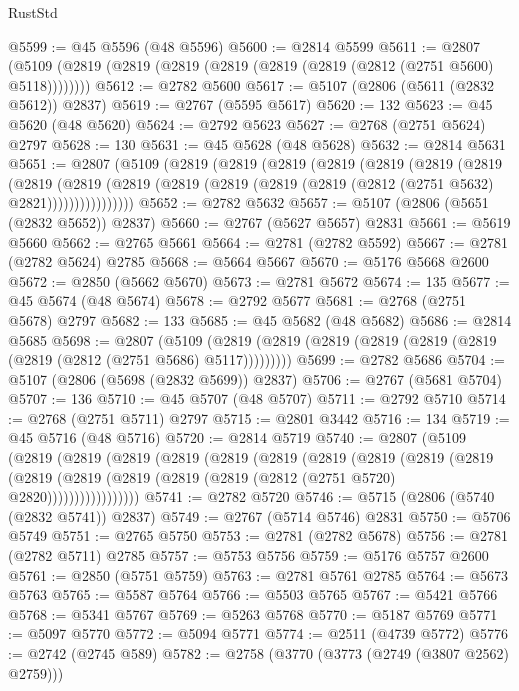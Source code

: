 \begin{lexlean}{RustStd}
\begin{coremodule}
@5599 := @45 @5596 (@48 @5596)
@5600 := @2814 @5599
@5611 := @2807 (@5109 (@2819 (@2819 (@2819 (@2819 (@2819 (@2819 (@2812 (@2751 @5600) @5118))))))))
@5612 := @2782 @5600
@5617 := @5107 (@2806 (@5611 (@2832 @5612)) @2837)
@5619 := @2767 (@5595 @5617)
@5620 := 132
@5623 := @45 @5620 (@48 @5620)
@5624 := @2792 @5623
@5627 := @2768 (@2751 @5624) @2797
@5628 := 130
@5631 := @45 @5628 (@48 @5628)
@5632 := @2814 @5631
@5651 := @2807
    (@5109
      (@2819
        (@2819
          (@2819
            (@2819
              (@2819
                (@2819
                  (@2819
                    (@2819
                      (@2819
                        (@2819
                          (@2819 (@2819 (@2819 (@2819 (@2812 (@2751 @5632) @2821))))))))))))))))
@5652 := @2782 @5632
@5657 := @5107 (@2806 (@5651 (@2832 @5652)) @2837)
@5660 := @2767 (@5627 @5657) @2831
@5661 := @5619 @5660
@5662 := @2765 @5661
@5664 := @2781 (@2782 @5592)
@5667 := @2781 (@2782 @5624) @2785
@5668 := @5664 @5667
@5670 := @5176 @5668 @2600
@5672 := @2850 (@5662 @5670)
@5673 := @2781 @5672
@5674 := 135
@5677 := @45 @5674 (@48 @5674)
@5678 := @2792 @5677
@5681 := @2768 (@2751 @5678) @2797
@5682 := 133
@5685 := @45 @5682 (@48 @5682)
@5686 := @2814 @5685
@5698 := @2807
    (@5109 (@2819 (@2819 (@2819 (@2819 (@2819 (@2819 (@2819 (@2812 (@2751 @5686) @5117)))))))))
@5699 := @2782 @5686
@5704 := @5107 (@2806 (@5698 (@2832 @5699)) @2837)
@5706 := @2767 (@5681 @5704)
@5707 := 136
@5710 := @45 @5707 (@48 @5707)
@5711 := @2792 @5710
@5714 := @2768 (@2751 @5711) @2797
@5715 := @2801 @3442
@5716 := 134
@5719 := @45 @5716 (@48 @5716)
@5720 := @2814 @5719
@5740 := @2807
    (@5109
      (@2819
        (@2819
          (@2819
            (@2819
              (@2819
                (@2819
                  (@2819
                    (@2819
                      (@2819
                        (@2819
                          (@2819
                            (@2819 (@2819 (@2819 (@2819 (@2812 (@2751 @5720) @2820)))))))))))))))))
@5741 := @2782 @5720
@5746 := @5715 (@2806 (@5740 (@2832 @5741)) @2837)
@5749 := @2767 (@5714 @5746) @2831
@5750 := @5706 @5749
@5751 := @2765 @5750
@5753 := @2781 (@2782 @5678)
@5756 := @2781 (@2782 @5711) @2785
@5757 := @5753 @5756
@5759 := @5176 @5757 @2600
@5761 := @2850 (@5751 @5759)
@5763 := @2781 @5761 @2785
@5764 := @5673 @5763
@5765 := @5587 @5764
@5766 := @5503 @5765
@5767 := @5421 @5766
@5768 := @5341 @5767
@5769 := @5263 @5768
@5770 := @5187 @5769
@5771 := @5097 @5770
@5772 := @5094 @5771
@5774 := @2511 (@4739 @5772)
@5776 := @2742 (@2745 @589)
@5782 := @2758 (@3770 (@3773 (@2749 (@3807 @2562) @2759)))

\end{coremodule}
\end{lexlean}
